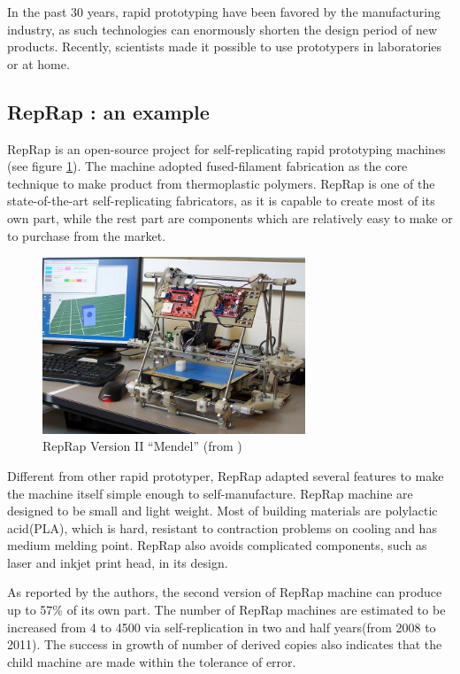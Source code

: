 \documentclass[12pt,twoside]{article}
\theoremstyle{plain}
\theoremstyle{definition}
\theoremstyle{remark}
\begin{document}
In the past 30 years, rapid prototyping have been favored by the manufacturing industry, as such technologies can enormously shorten the design period of new products. Recently, scientists made it possible to use prototypers in laboratories or at home.

\subsection{RepRap : an example}
RepRap is an open-source project for self-replicating rapid prototyping machines\cite{jones_reprap_2011} (see figure \ref{fig:reprap}). The machine adopted fused-filament
fabrication as the core technique to make product from thermoplastic polymers.
RepRap is one of the state-of-the-art self-replicating fabricators, as it is capable to create most of its own part, while the rest part are components which are relatively easy to make or to purchase from the market.

\begin{figure}[hbtp]
	 \centerline{\includegraphics[width=0.7\textwidth]{mendel}}
	 {\caption{RepRap Version II ``Mendel'' (from \cite{jones_reprap_2011})}
	 \label{fig:reprap}}
\end{figure}

Different from other rapid prototyper, RepRap adapted several features to make the machine itself simple enough to self-manufacture. RepRap machine are designed to be small and light weight. Most of building materials are polylactic acid(PLA), which is hard, resistant to contraction problems on cooling and has medium melding point. RepRap also avoids complicated components, such as laser and inkjet print head, in its design.

As reported by the authors, the second version of RepRap machine can produce up to 57\% of its own part. The number of RepRap machines are estimated to be increased from 4 to 4500 via self-replication in two and half years(from 2008 to 2011). The success in growth of number of derived copies also indicates that the child machine are made within the tolerance of error.
\end{document}
